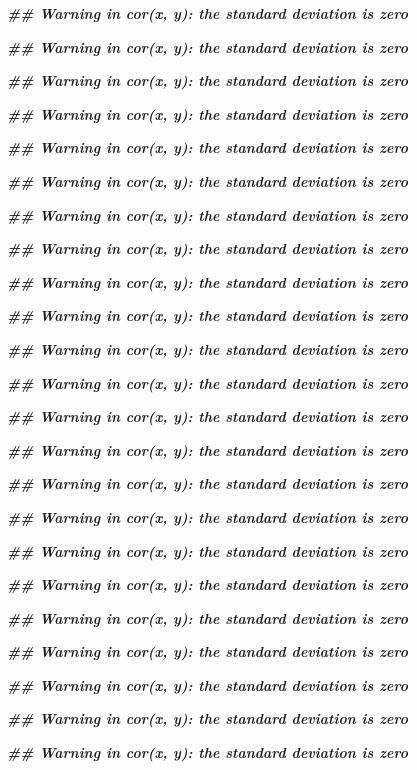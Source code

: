 \documentclass[
]{book}
\newenvironment{Shaded}{\begin{snugshade}}{\end{snugshade}}
\newcommand{\DocumentationTok}[1]{\textcolor[rgb]{0.56,0.35,0.01}{\textbf{\textit{#1}}}}
\begin{document}
\begin{Shaded}
\begin{Highlighting}[]
\DocumentationTok{\#\# Warning in cor(x, y): the standard deviation is zero}

\DocumentationTok{\#\# Warning in cor(x, y): the standard deviation is zero}

\DocumentationTok{\#\# Warning in cor(x, y): the standard deviation is zero}

\DocumentationTok{\#\# Warning in cor(x, y): the standard deviation is zero}

\DocumentationTok{\#\# Warning in cor(x, y): the standard deviation is zero}

\DocumentationTok{\#\# Warning in cor(x, y): the standard deviation is zero}

\DocumentationTok{\#\# Warning in cor(x, y): the standard deviation is zero}

\DocumentationTok{\#\# Warning in cor(x, y): the standard deviation is zero}

\DocumentationTok{\#\# Warning in cor(x, y): the standard deviation is zero}

\DocumentationTok{\#\# Warning in cor(x, y): the standard deviation is zero}

\DocumentationTok{\#\# Warning in cor(x, y): the standard deviation is zero}

\DocumentationTok{\#\# Warning in cor(x, y): the standard deviation is zero}

\DocumentationTok{\#\# Warning in cor(x, y): the standard deviation is zero}

\DocumentationTok{\#\# Warning in cor(x, y): the standard deviation is zero}

\DocumentationTok{\#\# Warning in cor(x, y): the standard deviation is zero}

\DocumentationTok{\#\# Warning in cor(x, y): the standard deviation is zero}

\DocumentationTok{\#\# Warning in cor(x, y): the standard deviation is zero}

\DocumentationTok{\#\# Warning in cor(x, y): the standard deviation is zero}

\DocumentationTok{\#\# Warning in cor(x, y): the standard deviation is zero}

\DocumentationTok{\#\# Warning in cor(x, y): the standard deviation is zero}

\DocumentationTok{\#\# Warning in cor(x, y): the standard deviation is zero}

\DocumentationTok{\#\# Warning in cor(x, y): the standard deviation is zero}

\DocumentationTok{\#\# Warning in cor(x, y): the standard deviation is zero}


\end{Highlighting}
\end{Shaded}
\end{document}
